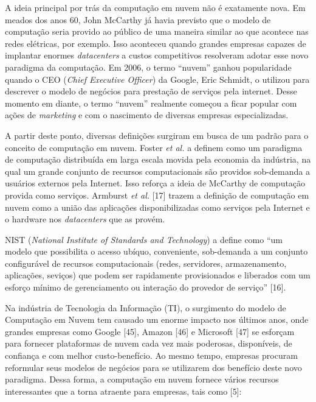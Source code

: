 A ideia principal por trás da computação em nuvem não é exatamente nova. Em meados dos anos 60, John McCarthy já havia previsto que o modelo de computação seria provido ao público de uma maneira similar ao que acontece nas redes elétricas, por exemplo. Isso aconteceu quando grandes empresas capazes de implantar enormes \textit{datacenters} a custos competitivos resolveram adotar esse novo paradigma da computação. Em 2006, o termo ``nuvem'' ganhou popularidade quando o CEO (\textit{Chief Executive Officer}) da Google, Eric Schmidt, o utilizou para descrever o modelo de negócios para prestação de serviços pela internet. Desse momento em diante, o termo ``nuvem'' realmente começou a ficar popular com ações de \textit{marketing} e com o nascimento de diversas empresas especializadas. 

A partir deste ponto, diversas definições surgiram em busca de um padrão para o conceito de computação em nuvem. Foster \textit{et al.} \cite{cloud_360} a definem como um paradigma de computação distribuída em larga escala movida pela economia da indústria, na qual um grande conjunto de recursos computacionais são providos sob-demanda a usuários externos pela Internet. Isso reforça a ideia de McCarthy de computação provida como serviços. Armburst \textit{et al.} [17] trazem a definição de computação em nuvem como a união das aplicações disponibilizadas como serviços pela Internet e o hardware nos \textit{datacenters} que as provém. 

NIST (\textit{National Institute of Standards and Technology}) a define como ``um modelo que possibilita o acesso ubíquo, conveniente, sob-demanda a um conjunto configurável de recursos computacionais (redes, servidores, armazenamento, aplicações, seviços) que podem ser rapidamente provisionados e liberados com um esforço mínimo de gerenciamento ou interação do provedor de serviço'' [16]. 

Na indústria de Tecnologia da Informação (TI), o surgimento do modelo de Computação em Nuvem tem causado um enorme impacto nos últimos anos, onde grandes empresas como Google [45], Amazon [46] e Microsoft [47] se esforçam para fornecer plataformas de nuvem cada vez mais poderosas, disponíveis, de confiança e com melhor custo-benefício. Ao mesmo tempo, empresas procuram reformular seus modelos de negócios para se utilizarem dos benefício deste novo paradigma. Dessa forma, a computação em nuvem fornece vários recursos interessantes que a torna atraente para empresas, tais como [5]:

